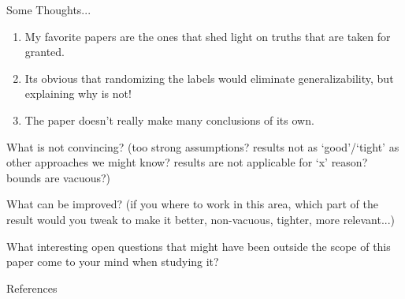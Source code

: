\documentclass[10pt]{beamer}
\begin{document}
\begin{frame}[fragile]{Some Thoughts... }
	\begin{enumerate}
		\item My favorite papers are the ones that shed light on truths that are taken for granted.
		\item Its obvious that randomizing the labels would eliminate generalizability, but explaining why is not!
		\item The paper doesn't really make many conclusions of its own.
	\end{enumerate}
	
	What is not convincing? (too strong assumptions? results not as ‘good’/‘tight’ as other approaches we might know? results are not applicable for ‘x’ reason? bounds are vacuous?)
	
	What can be improved? (if you where to work in this area, which part of the result would you tweak to make it better, non-vacuous, tighter, more relevant...)
	
	What interesting open questions that might have been outside the scope of this paper come to your mind when studying it?
\end{frame}	

\begin{frame}[fragile]{References}


\end{frame}	
	
\end{document}
